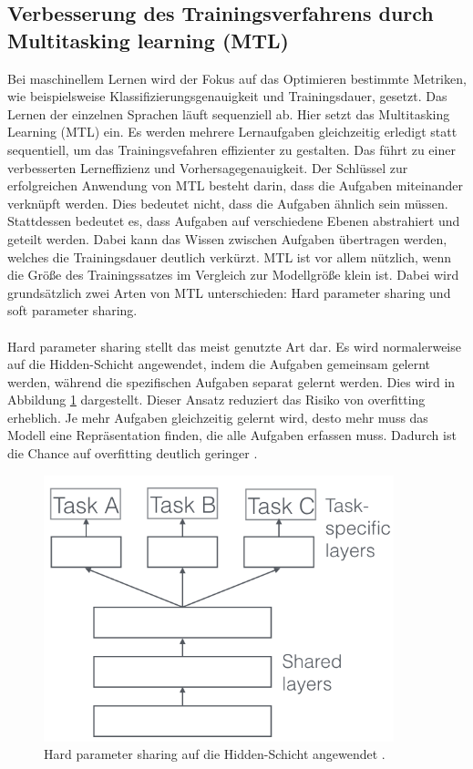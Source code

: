\subsection{Verbesserung des Trainingsverfahrens durch Multitasking learning (MTL)}
 Bei maschinellem Lernen wird der Fokus auf das Optimieren bestimmte Metriken, wie beispielsweise Klassifizierungsgenauigkeit und Trainingsdauer, gesetzt. Das Lernen der einzelnen Sprachen läuft sequenziell ab. Hier setzt das Multitasking Learning (MTL) ein. Es werden mehrere Lernaufgaben gleichzeitig erledigt statt sequentiell, um das Trainingsvefahren effizienter zu gestalten. Das führt zu einer verbesserten Lerneffizienz und Vorhersagegenauigkeit. Der Schlüssel zur erfolgreichen Anwendung von MTL besteht darin, dass die Aufgaben miteinander verknüpft werden. Dies bedeutet nicht, dass die Aufgaben ähnlich sein müssen. Stattdessen bedeutet es, dass Aufgaben auf verschiedene Ebenen abstrahiert und geteilt werden. Dabei kann das Wissen zwischen Aufgaben  übertragen werden, welches die Trainingsdauer deutlich verkürzt. MTL ist vor allem nützlich, wenn die Größe des Trainingssatzes im Vergleich zur Modellgröße klein ist. Dabei wird grundsätzlich zwei Arten von MTL unterschieden: Hard parameter sharing und soft parameter sharing. \\ \\ Hard parameter sharing stellt das meist genutzte Art dar\cite{Ruder.2017}. Es wird normalerweise auf die Hidden-Schicht angewendet, indem die Aufgaben gemeinsam gelernt werden, während die spezifischen Aufgaben separat gelernt werden. Dies wird in Abbildung \ref{fig:hard} dargestellt. Dieser Ansatz reduziert das Risiko von overfitting erheblich. Je mehr Aufgaben gleichzeitig gelernt wird, desto mehr muss das Modell eine Repräsentation finden, die alle Aufgaben erfassen muss. Dadurch ist die Chance auf overfitting deutlich geringer \cite{Ruder.2017} \cite{Lu_multitasklearning}.
  \begin{figure}[h!]
 	\centering
 	\includegraphics[width=0.8\linewidth]{images/hard}
 	\caption{Hard parameter sharing auf die Hidden-Schicht angewendet \cite{Kulbear.2017}.} %
 	\label{fig:hard}
 \end{figure}

